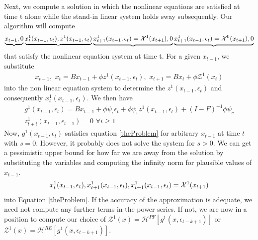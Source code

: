 \documentclass[12pt]{article}
\begin{document}
Next, we compute a solution in which the nonlinear equations are satisfied at time t alone while the stand-in linear system holds sway subsequently.
Our algorithm will  compute
\begin{gather*}
\underbrace{x_{t-1},0} 
\underbrace{x^{1}_t(x_{t-1},\epsilon_t),z^{1}(x_{t-1},\epsilon_t)}
\underbrace{x^{1}_{t+1}(x_{t-1},\epsilon_t)=\mathcal{X}^{1}(x_{t+1}),0}
\underbrace{x^{1}_{t+1}(x_{t-1},\epsilon_t)=\mathcal{X}^{0}(x_{t+1}),0}
\end{gather*}
that satisfy the nonlinear equation system at time t.
For a given $x_{t-1}$, we substitute
\begin{gather}
x_{t-1}, \,\,
  x_t=B x_{t-1} + \phi z^1(x_{t-1},\epsilon_t) , \,\,
  x_{t+1}=B x_{t} + \phi \mathcal{Z}^1(x_t)
\end{gather}
into the non linear equation system to determine the 
$z^1(x_{t-1},\epsilon_t)$ and consequently $x_t^1(x_{t-1},\epsilon_t)$.
We then have
 \begin{gather}
 g^1(x_{t-1},\epsilon_{t})=  
B x_{t-1}+ \phi \psi_\epsilon\epsilon_{t} +
\phi \psi_\epsilon z^1(x_{t-1},\epsilon_t)+
 (I - F)^{-1} \phi \psi_c\\ \label{firstIter}
z^{1}_{t+i}(x_{t-1},\epsilon_{t-1})=0 \,\, \forall i \ge 1
 \end{gather}
Now, $g^1(x_{t-1},\epsilon_{t})$
satisfies equation \ref{theProblem} for arbitrary $x_{t-1}$ at time $t$ with $s=0$.  However, it probably does not solve the system for $s>0$.
We can get a pessimistic upper bound for how far we are away from the solution 
by substituting the variables and computing the infinity norm for plausible values of $x_{t-1}$.
\begin{gather}
x^{1}_t(x_{t-1},\epsilon_t),x^{1}_{t+1}(x_{t-1},\epsilon_t),x^{1}_{t+1}(x_{t-1},\epsilon_t)=\mathcal{X}^{1}(x_{t+1})
\end{gather}
into Equation \ref{theProblem}. If the accuracy of the approximation is adequate, we need not compute any further  terms in the power series.  If not,
we are now in a position to compute our choice of
$\mathcal{Z}^1(x)=\mathcal{H}^{PF}[g^{1}(x,\epsilon_{t-k+1})]$ or
$\mathcal{Z}^1(x)=\mathcal{H}^{RE}[g^{1}(x,\epsilon_{t-k+1})]$.

\end{document}
